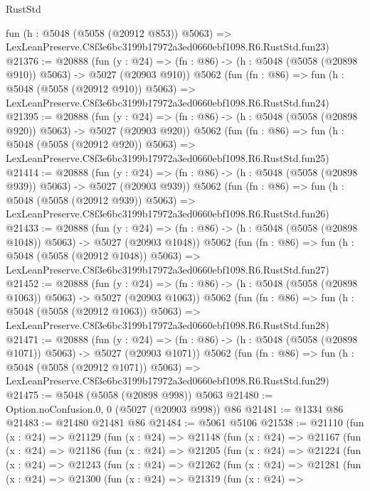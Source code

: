 \begin{lexlean}{RustStd}
\begin{coremodule}
    fun (h : @5048 (@5058 (@20912 @853)) @5063) =>
    LexLeanPreserve.C8f3e6bc3199b17972a3ed0660ebf1098.R6.RustStd.fun23)
@21376 := @20888
    (fun (y : @24) => (fn : @86) -> (h : @5048 (@5058 (@20898 @910)) @5063) -> @5027 (@20903 @910))
    @5062
    (fun (fn : @86) =>
    fun (h : @5048 (@5058 (@20912 @910)) @5063) =>
    LexLeanPreserve.C8f3e6bc3199b17972a3ed0660ebf1098.R6.RustStd.fun24)
@21395 := @20888
    (fun (y : @24) => (fn : @86) -> (h : @5048 (@5058 (@20898 @920)) @5063) -> @5027 (@20903 @920))
    @5062
    (fun (fn : @86) =>
    fun (h : @5048 (@5058 (@20912 @920)) @5063) =>
    LexLeanPreserve.C8f3e6bc3199b17972a3ed0660ebf1098.R6.RustStd.fun25)
@21414 := @20888
    (fun (y : @24) => (fn : @86) -> (h : @5048 (@5058 (@20898 @939)) @5063) -> @5027 (@20903 @939))
    @5062
    (fun (fn : @86) =>
    fun (h : @5048 (@5058 (@20912 @939)) @5063) =>
    LexLeanPreserve.C8f3e6bc3199b17972a3ed0660ebf1098.R6.RustStd.fun26)
@21433 := @20888
    (fun (y : @24) =>
    (fn : @86) -> (h : @5048 (@5058 (@20898 @1048)) @5063) -> @5027 (@20903 @1048))
    @5062
    (fun (fn : @86) =>
    fun (h : @5048 (@5058 (@20912 @1048)) @5063) =>
    LexLeanPreserve.C8f3e6bc3199b17972a3ed0660ebf1098.R6.RustStd.fun27)
@21452 := @20888
    (fun (y : @24) =>
    (fn : @86) -> (h : @5048 (@5058 (@20898 @1063)) @5063) -> @5027 (@20903 @1063))
    @5062
    (fun (fn : @86) =>
    fun (h : @5048 (@5058 (@20912 @1063)) @5063) =>
    LexLeanPreserve.C8f3e6bc3199b17972a3ed0660ebf1098.R6.RustStd.fun28)
@21471 := @20888
    (fun (y : @24) =>
    (fn : @86) -> (h : @5048 (@5058 (@20898 @1071)) @5063) -> @5027 (@20903 @1071))
    @5062
    (fun (fn : @86) =>
    fun (h : @5048 (@5058 (@20912 @1071)) @5063) =>
    LexLeanPreserve.C8f3e6bc3199b17972a3ed0660ebf1098.R6.RustStd.fun29)
@21475 := @5048 (@5058 (@20898 @998)) @5063
@21480 := Option.noConfusion.{0, 0} (@5027 (@20903 @998)) @86
@21481 := @1334 @86
@21483 := @21480 @21481 @86
@21484 := @5061 @5106
@21538 := @21110
    (fun (x : @24) =>
    @21129
      (fun (x : @24) =>
      @21148
        (fun (x : @24) =>
        @21167
          (fun (x : @24) =>
          @21186
            (fun (x : @24) =>
            @21205
              (fun (x : @24) =>
              @21224
                (fun (x : @24) =>
                @21243
                  (fun (x : @24) =>
                  @21262
                    (fun (x : @24) =>
                    @21281
                      (fun (x : @24) =>
                      @21300
                        (fun (x : @24) =>
                        @21319
                          (fun (x : @24) =>

\end{coremodule}
\end{lexlean}
